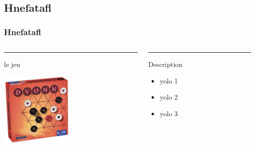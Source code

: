 \documentclass[11pt]{beamer}
\begin{document}
\subsection[Hnefatafl]{Hnefatafl}
\begin{frame}
\frametitle{Hnefatafl}

\begin{columns}[T] %
\begin{column}{.35\textwidth}
\color{red}\rule{\linewidth}{4pt}
 le jeu

\begin{center}
\includegraphics[width=100pt]{images/dvon.jpg}
\end{center}
\end{column}%

\hfill%
\begin{column}{.62\textwidth}
\color{blue}\rule{\linewidth}{4pt}
Description
\begin{itemize}
\item yolo 1
\item yolo 2
\item yolo 3
\end{itemize}
\end{column}%
\end{columns}

\end{frame}
\end{document}
